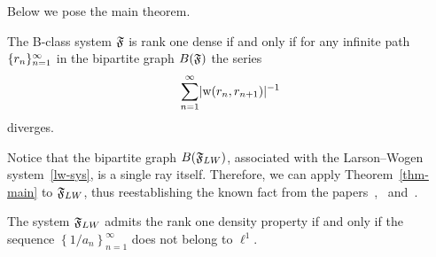 \documentclass[12pt,oneside,a4paper]{amsart}
\begin{document}
    \medskip
    Below we pose the main theorem.
    \begin{theorem}
      \label{thm-main}
      The B-class system $\mathfrak{F}$ is rank one dense if and only if
        for any infinite path $\{{r}_n\}_{n=1}^\infty$ in the bipartite graph $B(\mathfrak{F})$
        the series
        \[
          \sum_{n=1}^\infty\lvert\mathrm{w}(r_n, r_{n+1})\rvert^{-1}
        \]
        diverges.
    \end{theorem}
    Notice that the bipartite graph $B(\mathfrak{F}_{LW})$, associated with the Larson--Wogen system~\eqref{lw-sys},
      is a single ray itself.
    Therefore, we can apply Theorem~\ref{thm-main} to $\mathfrak{F}_{LW}$, thus reestablishing
      the known fact from the papers~\cite{katavolos},~\cite{larson} and~\cite{argyroslambrou}.
    \begin{corol*}
      The system $\mathfrak{F}_{LW}$ admits the rank one density property if and only if
        the sequence $\left\{1/a_n\right\}_{n=1}^\infty$ does not belong to $\ell^1$.
    \end{corol*}



\end{document}
